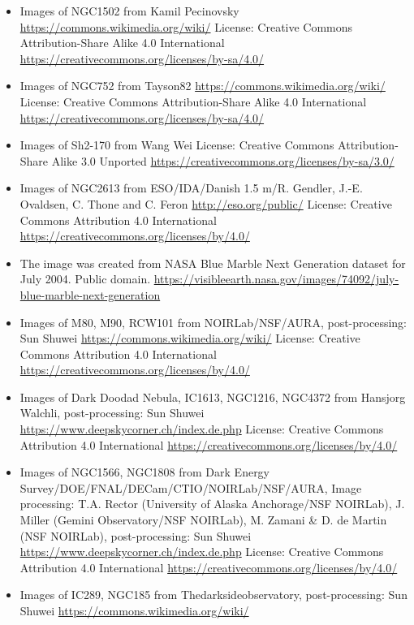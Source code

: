 \begin{itemize}
	 \url{https://www.spacetelescope.org/}
	 License: Creative Commons Attribution 4.0 International \url{https://creativecommons.org/licenses/by/4.0/}
\item Images of NGC1502
	 from Kamil Pecinovsky
	 \url{https://commons.wikimedia.org/wiki/}
	 License: Creative Commons Attribution-Share Alike 4.0 International \url{https://creativecommons.org/licenses/by-sa/4.0/}
\item Images of NGC752
	 from Tayson82
	 \url{https://commons.wikimedia.org/wiki/}
	 License: Creative Commons Attribution-Share Alike 4.0 International \url{https://creativecommons.org/licenses/by-sa/4.0/}
\item Images of Sh2-170
	 from Wang Wei
	 License: Creative Commons Attribution-Share Alike 3.0 Unported \url{https://creativecommons.org/licenses/by-sa/3.0/}
\item Images of NGC2613
	 from ESO/IDA/Danish 1.5 m/R. Gendler, J.-E. Ovaldsen, C. Thone and C. Feron
	 \url{http://eso.org/public/}
	 License: Creative Commons Attribution 4.0 International \url{https://creativecommons.org/licenses/by/4.0/}
\item The  image was created from NASA Blue Marble Next Generation
	 dataset for July 2004. Public domain.
	 \url{https://visibleearth.nasa.gov/images/74092/july-blue-marble-next-generation}
\item Images of M80, M90, RCW101
	 from NOIRLab/NSF/AURA, post-processing: Sun Shuwei 
	 \url{https://commons.wikimedia.org/wiki/}
	 License: Creative Commons Attribution 4.0 International \url{https://creativecommons.org/licenses/by/4.0/}
\item Images of Dark Doodad Nebula, IC1613, NGC1216, NGC4372
	 from Hansjorg Walchli, post-processing: Sun Shuwei
	 \url{https://www.deepskycorner.ch/index.de.php}
	 License: Creative Commons Attribution 4.0 International \url{https://creativecommons.org/licenses/by/4.0/}
\item Images of NGC1566, NGC1808
	 from Dark Energy Survey/DOE/FNAL/DECam/CTIO/NOIRLab/NSF/AURA, Image processing: T.A. Rector (University of Alaska Anchorage/NSF NOIRLab), J. Miller (Gemini Observatory/NSF NOIRLab), M. Zamani \& D. de Martin (NSF NOIRLab), post-processing: Sun Shuwei
	 \url{https://www.deepskycorner.ch/index.de.php}
	 License: Creative Commons Attribution 4.0 International \url{https://creativecommons.org/licenses/by/4.0/}
\item Images of IC289, NGC185
	 from Thedarksideobservatory, post-processing: Sun Shuwei
	 \url{https://commons.wikimedia.org/wiki/}

\end{itemize}
